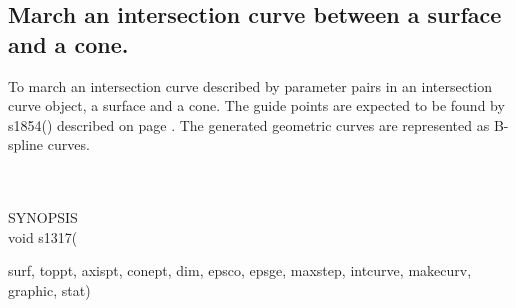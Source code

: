 \subsection{March an intersection curve between a surface and a cone.}
\begin{minipg1}
  To march an intersection curve described by parameter pairs in an intersection
  curve object, a surface and a cone.
  The guide points are expected to be found by s1854() described on
  page \pageref{s1854}.
  The generated geometric curves are represented as B-spline curves.
\end{minipg1} \\ \\
SYNOPSIS\\
        \>void s1317(\begin{minipg3}
        {\fov surf}, {\fov toppt}, {\fov axispt}, {\fov conept},
        {\fov dim}, {\fov epsco}, {\fov epsge}, {\fov maxstep},
        {\fov intcurve}, {\fov makecurv}, {\fov graphic}, {\fov stat})
                \end{minipg3}\\[0.3ex]

